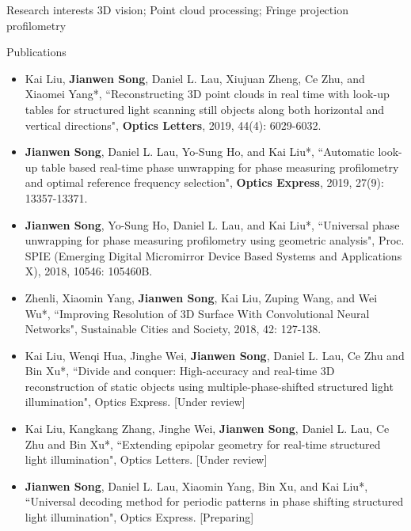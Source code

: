 \documentclass{resume} %
\begin{document}
\begin{rSection}{Research interests}
3D vision; Point cloud processing; Fringe projection profilometry
\end{rSection}
\begin{rSection}{Publications}

\begin{itemize}[leftmargin=*]
\item Kai Liu, {\bf Jianwen Song}, Daniel L. Lau, Xiujuan Zheng, Ce Zhu, and Xiaomei Yang*, ``Reconstructing 3D point clouds in real time with look-up tables for structured light scanning still objects along both horizontal and vertical directions", {\bf Optics Letters}, 2019, 44(4): 6029-6032.
\item {\bf Jianwen Song}, Daniel L. Lau, Yo-Sung Ho, and Kai Liu*, ``Automatic look-up table based real-time phase unwrapping for phase measuring profilometry and optimal reference frequency selection", {\bf Optics Express}, 2019, 27(9): 13357-13371.
\item {\bf Jianwen Song}, Yo-Sung Ho, Daniel L. Lau, and Kai Liu*, ``Universal phase unwrapping for phase measuring profilometry using geometric analysis", Proc. SPIE (Emerging Digital Micromirror Device Based Systems and Applications X), 2018, 10546: 105460B.
\item Zhenli, Xiaomin Yang, {\bf Jianwen Song}, Kai Liu, Zuping Wang, and Wei Wu*, ``Improving Resolution of 3D Surface With Convolutional Neural Networks", Sustainable Cities and Society, 2018, 42: 127-138.
\item Kai Liu, Wenqi Hua, Jinghe Wei, {\bf Jianwen Song}, Daniel L. Lau, Ce Zhu and Bin Xu*, ``Divide and conquer: High-accuracy and real-time 3D reconstruction of static objects using multiple-phase-shifted structured light illumination", Optics Express. [Under review]
\item Kai Liu, Kangkang Zhang, Jinghe Wei, {\bf Jianwen Song}, Daniel L. Lau, Ce Zhu and Bin Xu*, ``Extending epipolar geometry for real-time structured light illumination", Optics Letters. [Under review]
\item {\bf Jianwen Song}, Daniel L. Lau, Xiaomin Yang, Bin Xu, and Kai Liu*, ``Universal decoding method for periodic patterns in phase shifting structured light illumination", Optics Express. [Preparing]
\end{itemize}
\end{rSection}
\end{document}
